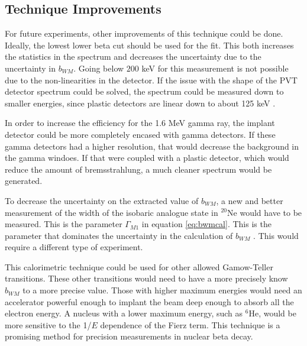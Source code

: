 \documentclass[../MaxHughesThesis.tex]{subfiles}
\begin{document}
\subsection{Technique Improvements}
For future experiments, other improvements of this technique could be done.
Ideally, the lowest lower beta cut should be used for the fit.
This both increases the statistics in the spectrum and decreases the uncertainty due to the uncertainty in $b_{WM}$.
Going below $200$ keV for this measurement is not possible due to the non-linearities in the detector.
If the issue with the shape of the PVT detector spectrum could be solved, the spectrum could be measured down to smaller energies, since plastic detectors are linear down to about 125 keV \cite{Kno10}. 

In order to increase the efficiency for the 1.6 MeV gamma ray, the implant detector could be more completely encased with gamma detectors.
If these gamma detectors had a higher resolution, that would decrease the background in the gamma windoes. 
If that were coupled with a plastic detector, which would reduce the amount of bremsstrahlung, a much cleaner spectrum would be generated.

To decrease the uncertainty on the extracted value of $b_{WM}$, a new and better measurement of the width of the isobaric analogue state in $^{20}$Ne would have to be measured.
This is the parameter $\Gamma_{M1}$ in equation \ref{eq:bwmcal}.
This is the parameter that dominates the uncertainty in  the calculation of $b_{WM}$ \cite{Min11}.
This would require a different type of experiment.

This calorimetric technique could be used for other allowed Gamow-Teller transitions.
These other transitions would need to have a more precisely know $b_{WM}$ to a more precise value.
Those with higher maximum energies would need an accelerator powerful enough to implant the beam deep enough to absorb all the electron energy.
A nucleus with a lower maximum energy, such as $^{6}$He, would be more sensitive to the 1/$E$ dependence of the Fierz term. 
This technique is a promising method for precision measurements in nuclear beta decay.
\end{document}
